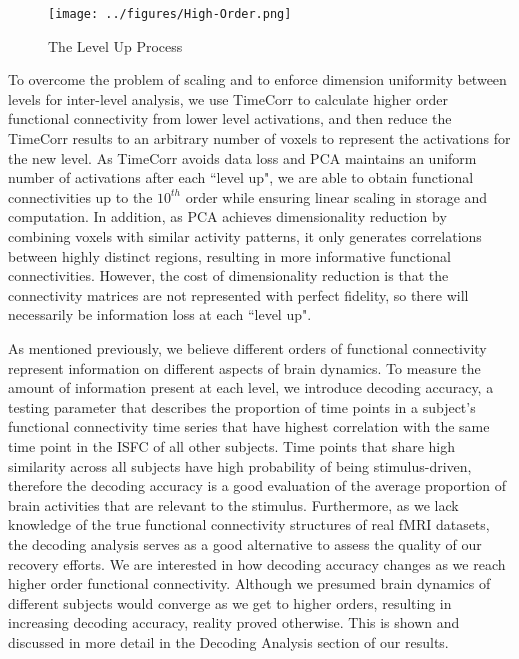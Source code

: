 \documentclass[11pt]{article}
\begin{document}
\begin{figure}[!htb]
\setlength{\belowcaptionskip}{15pt}
\caption{The Level Up Process}
\centering
\texttt{[image: ../figures/High-Order.png]}
\label{fig:HighOrder}
\end{figure}

To overcome the problem of scaling and to enforce dimension uniformity between levels for inter-level analysis, we use TimeCorr to calculate higher order functional connectivity from lower level activations, and then reduce the TimeCorr results to an arbitrary number of voxels to represent the activations for the new level. As TimeCorr avoids data loss and PCA maintains an uniform number of activations after each ``level up", we are able to obtain functional connectivities up to the $10^{th}$ order while ensuring linear scaling in storage and computation. In addition, as PCA achieves dimensionality reduction by combining voxels with similar activity patterns, it only generates correlations between highly distinct regions, resulting in more informative functional connectivities. However, the cost of dimensionality reduction is that the connectivity matrices are not represented with perfect fidelity, so there will necessarily be information loss at each ``level up".

As mentioned previously, we believe different orders of functional connectivity represent information on different aspects of brain dynamics. To measure the amount of information present at each level, we introduce decoding accuracy, a testing parameter that describes the proportion of time points in a subject's functional connectivity time series that have highest correlation with the same time point in the ISFC of all other subjects. Time points that share high similarity across all subjects have high probability of being stimulus-driven, therefore the decoding accuracy is a good evaluation of the average proportion of brain activities that are relevant to the stimulus. Furthermore, as we lack knowledge of the true functional connectivity structures of real fMRI datasets, the decoding analysis serves as a good alternative to assess the quality of our recovery efforts. We are interested in how decoding accuracy changes as we reach higher order functional connectivity. Although we presumed brain dynamics of different subjects would converge as we get to higher orders, resulting in increasing decoding accuracy, reality proved otherwise. This is shown and discussed in more detail in the Decoding Analysis section of our results.
\end{document}
